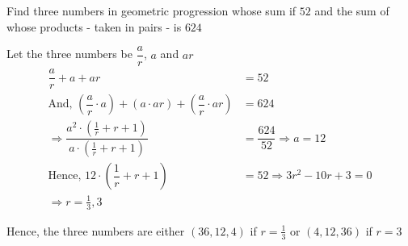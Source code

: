 
%
%
%
%
% 
% 

\question Find three numbers in geometric progression whose sum if $52$ and the
sum of whose products - taken in pairs - is $624$

\insertQR{}

\ifprintanswers
\fi 

\begin{solution}
	Let the three numbers be $\dfrac{a}{r}$, $a$ and $ar$
	\begin{align}
		\dfrac{a}{r} + a + ar &= 52 \\
		\text{And, } \left( \dfrac{a}{r}\cdot a\right) + \left( a\cdot ar\right) + 
		\left( \dfrac{a}{r}\cdot ar\right) &= 624 \\
		\Rightarrow \dfrac{a^2\cdot\left( \frac{1}{r} + r + 1 \right)}{a\cdot\left( \frac{1}{r} + r + 1\right)}
		&= \dfrac{624}{52} \Rightarrow a = 12 \\
		\text{Hence, } 12\cdot\left( \dfrac{1}{r} + r + 1 \right) &= 52 \Rightarrow 3r^2-10r + 3 = 0 \\
		\Rightarrow r = \frac{1}{3}, 3
	\end{align}
	
	Hence, the three numbers are either $(36,12,4)$ if $r=\frac{1}{3}$ or $(4,12,36)$ if $r=3$
\end{solution}

